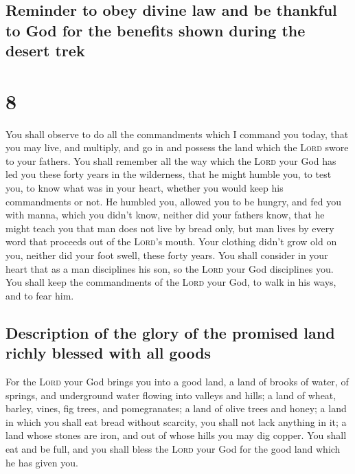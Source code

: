 \hypertarget{reminder-to-obey-divine-law-and-be-thankful-to-god-for-the-benefits-shown-during-the-desert-trek}{%
\subsection{Reminder to obey divine law and be thankful to God for the
benefits shown during the desert
trek}\label{reminder-to-obey-divine-law-and-be-thankful-to-god-for-the-benefits-shown-during-the-desert-trek}}

\hypertarget{section-7}{%
\section{8}\label{section-7}}

 You shall observe to do all the commandments which I
command you today, that you may live, and multiply, and go in and
possess the land which the \textsc{Lord} swore to your fathers.
 You shall remember all the way which the \textsc{Lord}
your God has led you these forty years in the wilderness, that he might
humble you, to test you, to know what was in your heart, whether you
would keep his commandments or not.  He humbled you,
allowed you to be hungry, and fed you with manna, which you didn't know,
neither did your fathers know, that he might teach you that man does not
live by bread only, but man lives by every word that proceeds out of the
\textsc{Lord}'s mouth.  Your clothing didn't grow old on
you, neither did your foot swell, these forty years.  You
shall consider in your heart that as a man disciplines his son, so the
\textsc{Lord} your God disciplines you.  You shall keep
the commandments of the \textsc{Lord} your God, to walk in his ways, and
to fear him.

\hypertarget{description-of-the-glory-of-the-promised-land-richly-blessed-with-all-goods}{%
\subsection{Description of the glory of the promised land richly blessed
with all
goods}\label{description-of-the-glory-of-the-promised-land-richly-blessed-with-all-goods}}

 For the \textsc{Lord} your God brings you into a good
land, a land of brooks of water, of springs, and underground water
flowing into valleys and hills;  a land of wheat, barley,
vines, fig trees, and pomegranates; a land of olive trees and honey;
 a land in which you shall eat bread without scarcity, you
shall not lack anything in it; a land whose stones are iron, and out of
whose hills you may dig copper.  You shall eat and be
full, and you shall bless the \textsc{Lord} your God for the good land
which he has given you.


